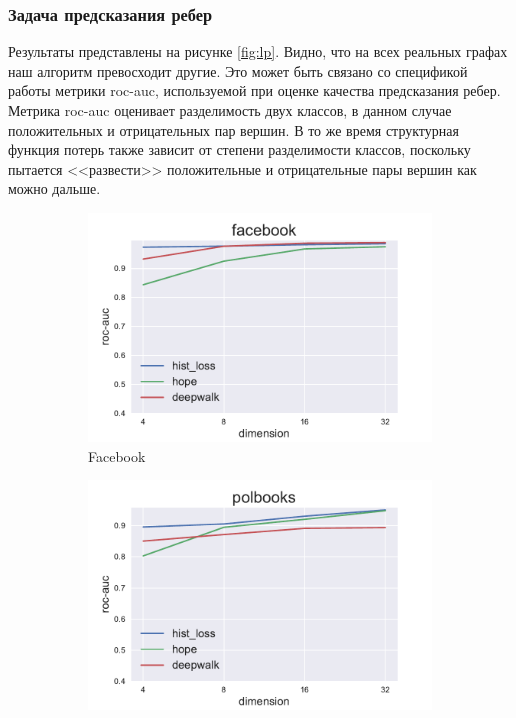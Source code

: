 \documentclass[12pt,a4paper]{extarticle}
\begin{document}
    \subsubsection{Задача предсказания ребер}

    Результаты представлены на рисунке \ref{fig:lp}. Видно, что на всех реальных графах наш алгоритм превосходит другие. Это может быть связано со спецификой работы метрики roc-auc, используемой при оценке качества предсказания ребер.
    Метрика roc-auc оценивает разделимость двух классов, в данном случае положительных и отрицательных пар вершин. В то же время структурная функция потерь также зависит от степени разделимости классов, поскольку пытается <<развести>> положительные и отрицательные пары вершин как можно дальше.
    
    \begin{figure}
    \begin{subfigure}{.5\linewidth}
    \centering
    \includegraphics[width=\linewidth]{src/images/Link_prediction_facebook.pdf}
    \caption{Facebook}
    \label{fig:lp_face}
    \end{subfigure}
    \begin{subfigure}{.5\linewidth}
    \centering
    \includegraphics[width=\linewidth]{src/images/Link_prediction_polbooks.pdf}

\end{subfigure}
\end{figure}
\end{document}
